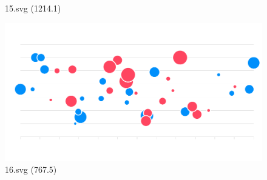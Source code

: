 \documentclass[journal]{IEEEtran}
\begin{document}
\begin{figure}[!htbp]
\begin{minipage}{0.233\columnwidth}
{15.svg (1214.1)}
\end{minipage}
\hfill
\begin{minipage}{0.233\columnwidth}
\centering
\includegraphics[width=\textwidth]{Test_set/16.pdf}
{16.svg (767.5)}
\end{minipage}
\end{figure}
\end{document}
